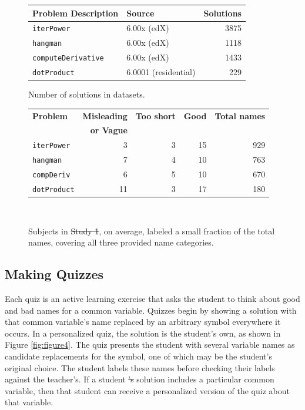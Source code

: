 \documentclass[12pt,twoside]{mitthesis}
\newcommand\tabhead[1]{\small\textbf{#1}}
\newcommand \codevar[1]{\texttt{#1}}
\providecommand{\DIFaddtex}[1]{{\protect\color{blue}\uwave{#1}}} %
\providecommand{\DIFdeltex}[1]{{\protect\color{red}\sout{#1}}}                      %
\providecommand{\DIFaddbegin}{} %
\providecommand{\DIFdelbegin}{} %
\providecommand{\DIFdelend}{} %
\providecommand{\DIFaddFL}[1]{\DIFadd{#1}} %
\providecommand{\DIFdelFL}[1]{\DIFdel{#1}} %
\providecommand{\DIFaddbeginFL}{} %
\providecommand{\DIFaddendFL}{} %
\providecommand{\DIFdelbeginFL}{} %
\providecommand{\DIFdelendFL}{} %
\providecommand{\DIFadd}[1]{\texorpdfstring{\DIFaddtex{#1}}{#1}} %
\providecommand{\DIFdel}[1]{\texorpdfstring{\DIFdeltex{#1}}{}} %
\begin{document}
{{{{{{{{{{\DIFdelbegin %
\DIFdelend \DIFaddbegin \begin{figure}
\DIFaddendFL \begin{minipage}{1\columnwidth}
\centering
\begin{tabular} {|l|l|r|}
\hline
\tabhead{Problem Description} & \tabhead{Source} & \tabhead{Solutions} \\ \hline \hline
\codevar{iterPower} & 6.00x (edX) & 3875 \\ \hline
\codevar{hangman} & 6.00x (edX) & 1118 \\ \hline
\codevar{computeDerivative} & 6.00x (edX) & 1433 \\ \hline
\codevar{dotProduct} & 6.0001 (residential) & 229 \\ \hline
\end{tabular}
\caption{Number of solutions in datasets.}
\label{solutioncounttable}
\end{minipage}

\bigskip
\begin{minipage}{1\columnwidth}
\centering
\begin{tabular}{|l|r|r|r|r|}
\hline
\tabhead{Problem} & \tabhead{Misleading} & \tabhead{Too short} & \tabhead{Good} & \tabhead{Total names} \\
& \tabhead{or Vague} & & & \\ \hline \hline
\codevar{iterPower} & 3 & 3 & 15 & 929 \\ \hline
\codevar{hangman} &7 & 4 & 10 & 763 \\ \hline
\codevar{compDeriv} & 6 & 5 & 10 & 670 \\ \hline
\codevar{dotProduct} & 11 & 3 & 17 & 180 \\ \hline
\end{tabular}
\caption{Subjects in \DIFdelbeginFL \DIFdelFL{Study 1}\DIFdelendFL \DIFaddbeginFL \DIFaddFL{the teacher study}\DIFaddendFL , on average, labeled a small fraction of the total names, covering all three provided name categories.}~\label{tab:averageLabeling}
\end{minipage}

\end{figure}

\subsection{Making Quizzes}

Each quiz is an active learning exercise that asks the student to think about good and bad names for a common variable. Quizzes begin by showing a solution with that common variable's name replaced by an arbitrary symbol everywhere it occurs. In a personalized quiz, the solution is the student's own, as shown in Figure \ref{fig:figure4}. The quiz presents the student with several variable names as candidate replacements for the symbol, one of which may be the student's original choice. The student labels these names before checking their labels against the teacher's. If a student \DIFdelbegin \DIFdel{'s }\DIFdelend solution includes a particular common variable, then that student can receive a personalized version of the quiz about that variable.

}}}}}}}}}}
\end{document}
